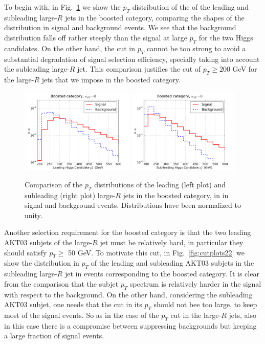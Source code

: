 %
To begin with,
in Fig.~\ref{fig:cutplots1} we show
the $p_T$ distribution of the 
of the
  leading and subleading large-$R$ jets in the boosted category, comparing
  the shapes of the distribution in signal and background events.
  We see that the background distribution
  falls off rather steeply than the signal at large $p_T$
  for the two Higgs candidates.
  On the other hand, the cut in $p_T$ cannot be too strong to avoid
  a substantial degradation of signal selection efficiency,
  specially taking into account the subleading large-$R$ jet.
  This comparison justifies the cut of $p_T \ge 200$ GeV
  for the large-$R$ jets that we impose in the boosted category.
  

\begin{figure}[t]
\begin{center}
 \includegraphics[width=0.48\textwidth]{plots/pt_H0_bst_C1d_noPU.pdf}
 \includegraphics[width=0.48\textwidth]{plots/pt_H1_bst_C1d_noPU.pdf}
\caption{\small  Comparison of the $p_T$ distributions of the
  leading (left plot) and
  subleading (right plot) large-$R$ jets in the boosted category,
  in in signal and background events.
  Distributions have been normalized to unity.
}
\label{fig:cutplots1}
\end{center}
\end{figure}


Another selection requirement for the boosted category is that the two
leading AKT03 subjets of the large-$R$ jet must be relatively hard,
in particular they should satisfy $p_T \ge $ 50 GeV.
%
To motivate this cut, in Fig.~\ref{fig:cutplots22}
we show the distribution in $p_T$ of the leading
and subleading AKT03 subjets in the subleading large-$R$ jet in events
corresponding to the boosted category.
%
It is clear from the comparison that the subjet $p_T$ spectrum is
relatively harder in the signal with respect to the background.
%
On the other hand, considering the subleading AKT03 subjet, one needs that
the cut in its  $p_T$ should not bee too large, to keep most of the signal events.
%
So as in the case of the $p_T$ cut in the large-$R$ jets, also in this case there
is a compromise between suppressing backgrounds but keeping a large fraction of
signal events.


